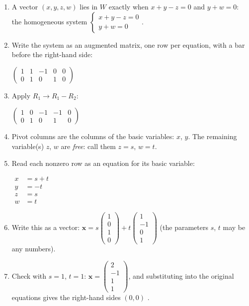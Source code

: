 \documentclass[11pt]{article}
\begin{document}
\begin{tcolorbox}[breakable,colback=ans,colframe=ansb,boxrule=0.5pt,left=4pt,right=4pt,top=2pt,bottom=2pt]\begin{enumerate}[leftmargin=3.1em,itemsep=1pt,topsep=1pt,label=\textbf{Step \arabic*.}]\item A vector $(x,y,z,w)$ lies in $W$ exactly when $x+y-z=0$ and $y+w=0$: the homogeneous system $\begin{cases}x+y-z=0\\ y+w=0\end{cases}$.
\item Write the system as an augmented matrix, one row per equation, with a bar before the right-hand side:\par\smallskip $\displaystyle \left(\begin{array}{cccc|c}1 & 1 & -1 & 0 & 0 \\ 0 & 1 & 0 & 1 & 0\end{array}\right)$
\item Apply $R_1\to R_1-R_2$:\par\smallskip $\displaystyle \left(\begin{array}{cccc|c}1 & 0 & -1 & -1 & 0 \\ 0 & 1 & 0 & 1 & 0\end{array}\right)$
\item Pivot columns are the columns of the basic variables: $x$, $y$. The remaining variable(s) $z$, $w$ are \emph{free}: call them $z=s$, $w=t$.
\item Read each nonzero row as an equation for its basic variable:\par\smallskip $\displaystyle\begin{aligned}x&=s+t\\ y&=-t\\ z&=s\\ w&=t\end{aligned}$
\item Write this as a vector: $\displaystyle \mathbf x=s\begin{pmatrix}1\\0\\1\\0\end{pmatrix}+t\begin{pmatrix}1\\-1\\0\\1\end{pmatrix}$ (the parameters $s$, $t$ may be any numbers).
\item Check with $s=1$, $t=1$: $\mathbf x=\begin{pmatrix}2\\-1\\1\\1\end{pmatrix}$, and substituting into the original equations gives the right-hand sides $(0,0)$ \checkmark.

\end{enumerate}
\end{tcolorbox}
\end{document}
